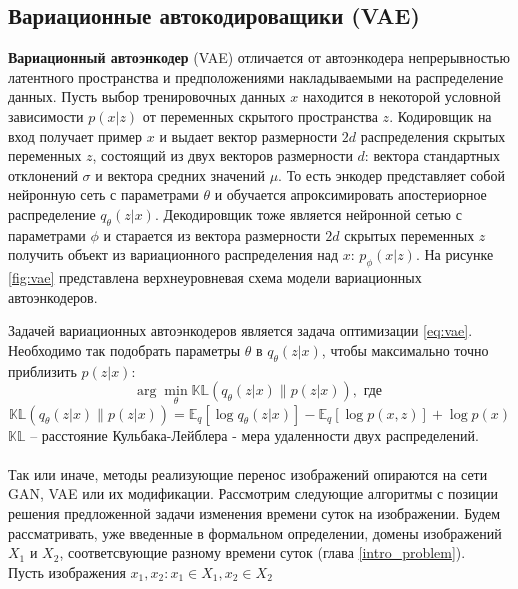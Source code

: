 \documentclass[11pt,a4paper]{extarticle}
\begin{document}
		\subsection{Вариационные автокодироващики (VAE)}		

			\textbf{Вариационный автоэнкодер} (VAE) отличается от автоэнкодера непрерывностью латентного пространства
			и предположениями накладываемыми на распределение данных.
			Пусть выбор тренировочных данных $x$ находится в некоторой условной зависимости $p(x|z)$ от переменных скрытого пространства $z$.
			Кодировщик на вход получает пример $x$ и выдает вектор размерности $2d$ распределения скрытых переменных $z$, состоящий из двух векторов размерности $d$:
			вектора стандартных отклонений $\sigma$ и вектора средних значений $\mu$. 
			То есть энкодер представляет собой нейронную сеть с параметрами $\theta$ и обучается апроксимировать апостериорное распределение $q_{\theta}(z|x)$.
			Декодировщик тоже является нейронной сетью с параметрами $\phi$ и старается из вектора размерности $2d$ скрытых переменных $z$ получить объект из вариационного распределения над $x$: $p_{\phi}(x|z)$.
			На рисунке \ref{fig:vae} представлена верхнеуровневая схема модели вариационных автоэнкодеров.

			Задачей вариационных автоэнкодеров является задача оптимизации \eqref{eq:vae}.
			Необходимо так подобрать параметры $\theta$ в $q_{\theta}(z|x)$, чтобы максимально точно приблизить $p(z|x)$:
			\begin{equation} \label{eq:vae}
				\arg\min_{\theta} \mathbb{KL}(q_{\theta}(z|x)\|p(z|x)), \text { где }
			\end{equation}
			\begin{equation*}
				\mathbb{KL}(q_{\theta}(z|x)\|p(z|x)) = \mathbb{E}_q[\log q_{\theta}(z|x)] - \mathbb{E}_q[\log p(x,z)] + \log p(x)
			\end{equation*}
			$\mathbb{KL}$ -- расстояние Кульбака-Лейблера - мера удаленности двух распределений.
			\\\\ 
			Так или иначе, методы реализующие перенос изображений опираются на сети GAN, VAE или их модификации.
			Рассмотрим следующие алгоритмы с позиции решения предложенной задачи изменения времени суток на изображении.
			Будем рассматривать, уже введенные в формальном определении, домены изображений \(X_{1}\) и \(X_{2}\), соответсвующие разному времени суток (глава \ref{intro_problem}).
			\\Пусть изображения \(x_{1},x_{2}: x_{1} \in X_{1}, x_{2} \in X_{2}\)
		
\end{document}
